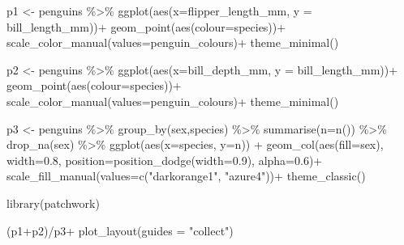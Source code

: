 \documentclass[
]{book}
\newenvironment{Shaded}{\begin{snugshade}}{\end{snugshade}}
\newcommand{\AttributeTok}[1]{\textcolor[rgb]{0.77,0.63,0.00}{#1}}
\newcommand{\FloatTok}[1]{\textcolor[rgb]{0.00,0.00,0.81}{#1}}
\newcommand{\FunctionTok}[1]{\textcolor[rgb]{0.00,0.00,0.00}{#1}}
\newcommand{\NormalTok}[1]{#1}
\newcommand{\OtherTok}[1]{\textcolor[rgb]{0.56,0.35,0.01}{#1}}
\newcommand{\SpecialCharTok}[1]{\textcolor[rgb]{0.00,0.00,0.00}{#1}}
\newcommand{\StringTok}[1]{\textcolor[rgb]{0.31,0.60,0.02}{#1}}
\begin{document}
\begin{Shaded}
\begin{Highlighting}[]
\NormalTok{p1 }\OtherTok{\textless{}{-}}\NormalTok{ penguins }\SpecialCharTok{\%\textgreater{}\%} 
  \FunctionTok{ggplot}\NormalTok{(}\FunctionTok{aes}\NormalTok{(}\AttributeTok{x=}\NormalTok{flipper\_length\_mm, }
             \AttributeTok{y =}\NormalTok{ bill\_length\_mm))}\SpecialCharTok{+}
  \FunctionTok{geom\_point}\NormalTok{(}\FunctionTok{aes}\NormalTok{(}\AttributeTok{colour=}\NormalTok{species))}\SpecialCharTok{+}
  \FunctionTok{scale\_color\_manual}\NormalTok{(}\AttributeTok{values=}\NormalTok{penguin\_colours)}\SpecialCharTok{+}
  \FunctionTok{theme\_minimal}\NormalTok{()}

\NormalTok{p2 }\OtherTok{\textless{}{-}}\NormalTok{ penguins }\SpecialCharTok{\%\textgreater{}\%} 
  \FunctionTok{ggplot}\NormalTok{(}\FunctionTok{aes}\NormalTok{(}\AttributeTok{x=}\NormalTok{bill\_depth\_mm, }
             \AttributeTok{y =}\NormalTok{ bill\_length\_mm))}\SpecialCharTok{+}
  \FunctionTok{geom\_point}\NormalTok{(}\FunctionTok{aes}\NormalTok{(}\AttributeTok{colour=}\NormalTok{species))}\SpecialCharTok{+}
  \FunctionTok{scale\_color\_manual}\NormalTok{(}\AttributeTok{values=}\NormalTok{penguin\_colours)}\SpecialCharTok{+}
  \FunctionTok{theme\_minimal}\NormalTok{()}

\NormalTok{p3 }\OtherTok{\textless{}{-}}\NormalTok{ penguins }\SpecialCharTok{\%\textgreater{}\%}     
  \FunctionTok{group\_by}\NormalTok{(sex,species) }\SpecialCharTok{\%\textgreater{}\%} 
    \FunctionTok{summarise}\NormalTok{(}\AttributeTok{n=}\FunctionTok{n}\NormalTok{()) }\SpecialCharTok{\%\textgreater{}\%} 
     \FunctionTok{drop\_na}\NormalTok{(sex) }\SpecialCharTok{\%\textgreater{}\%} 
     \FunctionTok{ggplot}\NormalTok{(}\FunctionTok{aes}\NormalTok{(}\AttributeTok{x=}\NormalTok{species, }\AttributeTok{y=}\NormalTok{n)) }\SpecialCharTok{+} 
  \FunctionTok{geom\_col}\NormalTok{(}\FunctionTok{aes}\NormalTok{(}\AttributeTok{fill=}\NormalTok{sex), }
               \AttributeTok{width=}\FloatTok{0.8}\NormalTok{,}
               \AttributeTok{position=}\FunctionTok{position\_dodge}\NormalTok{(}\AttributeTok{width=}\FloatTok{0.9}\NormalTok{), }
               \AttributeTok{alpha=}\FloatTok{0.6}\NormalTok{)}\SpecialCharTok{+}
     \FunctionTok{scale\_fill\_manual}\NormalTok{(}\AttributeTok{values=}\FunctionTok{c}\NormalTok{(}\StringTok{"darkorange1"}\NormalTok{, }\StringTok{"azure4"}\NormalTok{))}\SpecialCharTok{+}
     \FunctionTok{theme\_classic}\NormalTok{()}

\FunctionTok{library}\NormalTok{(patchwork)}

\NormalTok{ (p1}\SpecialCharTok{+}\NormalTok{p2)}\SpecialCharTok{/}\NormalTok{p3}\SpecialCharTok{+}
  \FunctionTok{plot\_layout}\NormalTok{(}\AttributeTok{guides =} \StringTok{"collect"}\NormalTok{) }
\end{Highlighting}
\end{Shaded}
\end{document}
